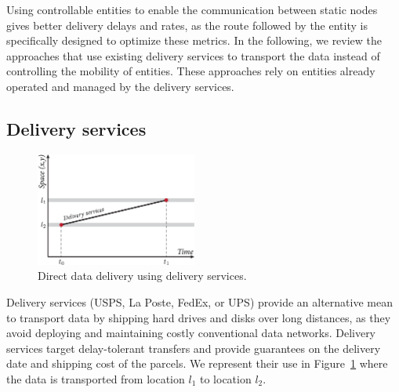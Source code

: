 Using controllable entities to enable the communication between static nodes gives better delivery delays and rates, as the route followed by the entity is specifically designed to optimize these metrics. In the following, we review the approaches that use existing delivery services to transport the data instead of controlling the mobility of entities. These approaches rely on entities already operated and managed by the delivery services.

\subsection{Delivery services}
\label{sec:thrid-party-services}


\begin{figure}
    \vspace{-10pt}
    \centering
    \includegraphics[width=5.3cm]{figures/dtn-direct-delivery.pdf}
    \caption{Direct data delivery using delivery services.}
    \label{fig:dtn-direct-delivery}
\end{figure}
Delivery services (\eg USPS, La Poste, FedEx, or UPS) provide an alternative mean to transport data by shipping hard drives and disks over long distances, as they avoid deploying and maintaining costly conventional data networks. Delivery services target delay-tolerant transfers and provide guarantees on the delivery date and shipping cost of the parcels. We represent their use in Figure~\ref{fig:dtn-direct-delivery} where the data is transported from location $l_1$ to location $l_2$.

